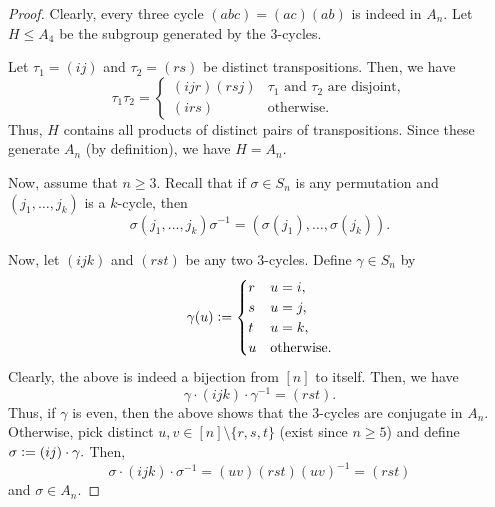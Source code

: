 \Angenerator*\label{lem:Angenerator2}
\begin{flushright}\hyperref[lem:Angenerator]{\upsym}\end{flushright}
\begin{proof}
    Clearly, every three cycle $(a b c) = (a c)(a b)$ is indeed in $A_n.$ Let $H \le A_4$ be the subgroup generated by the $3$-cycles.

    Let $\tau_1 = (i j)$ and $\tau_2 = (r s)$ be distinct transpositions. Then, we have
    \begin{equation*} 
        \tau_1\tau_2 = \begin{cases}
            (i j r)(r s j) & \tau_1 \text{ and } \tau_2 \text{ are disjoint},\\
            (irs) & \text{otherwise}.
        \end{cases}
    \end{equation*}
    Thus, $H$ contains all products of distinct pairs of transpositions. Since these generate $A_n$ (by definition), we have $H = A_n.$

    Now, assume that $n \ge 3.$ Recall that if $\sigma \in S_n$ is any permutation and $(j_1, \ldots, j_k)$ is a $k$-cycle, then
    \begin{equation*} 
        \sigma(j_1, \ldots, j_k)\sigma^{-1} = (\sigma(j_1), \ldots, \sigma(j_k)).
    \end{equation*}

    Now, let $(i j k)$ and $(r s t)$ be any two $3$-cycles. Define $\gamma \in S_n$ by
    \begin{equation*} 
        \gamma(u) \vcentcolon= \begin{cases}
            r & u = i, \\
            s & u = j, \\
            t & u = k, \\
            u & \text{otherwise}.
        \end{cases}
    \end{equation*}
    Clearly, the above is indeed a bijection from $[n]$ to itself. Then, we have
    \begin{equation*} 
        \gamma\cdot(i j k)\cdot\gamma^{-1} = (r s t).
    \end{equation*}
    Thus, if $\gamma$ is even, then the above shows that the $3$-cycles are conjugate in $A_n.$ Otherwise, pick distinct $u, v \in [n] \setminus \{r, s, t\}$ (exist since $n \ge 5$) and define $\sigma \vcentcolon= (i j) \cdot \gamma.$ Then,
    \begin{equation*} 
        \sigma\cdot(i j k)\cdot\sigma^{-1} = (u v)(r s t)(u v)^{-1} = (r s t)
    \end{equation*}
    and $\sigma \in A_n.$
\end{proof}

